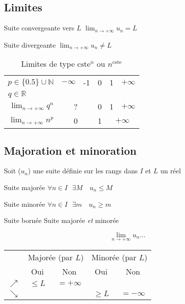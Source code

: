\documentclass{article}
\newcommand{\R}{\mathds{R}}
\newcommand{\N}{\mathds{N}}
\newcommand{\twoCols}[1]{\multicolumn{2}{c|}{#1}}
\newcommand{\twoColsNB}[1]{\multicolumn{2}{c}{#1}}
\newcommand{ \const}{\text{cste}}
\newenvironment{descriptiona}{\begin{description}[leftmargin=!,labelwidth=\widthof{\bfseries The longest label}]}{\end{description}}
\begin{document}
\subsection{Limites}
\begin{descriptiona}
\item[Suite convergeante vers $L$] $\displaystyle \lim_{n\to+\infty} u_n = L$
\item[Suite divergeante] $\displaystyle \lim_{n\to+\infty} u_n \not= L$
\end{descriptiona}

\begin{minipage}{\textwidth}

\begin{table}[H]
    \centering
    \begin{tabular}{r||l|c|c|c|l}
         $p \in \{0.5\}\cup\N$            & $-\infty$ & -1 & 0 & 1 & $+\infty$  \\
         $q \in \R\quad\quad\quad\;\:$ & & & & \\\hline\hline
        $\displaystyle\lim_{n\to+\infty} q^n$ & \twoCols{?} & 0 & 1 & $+\infty$ \\\hline
        $\displaystyle\lim_{n\to+\infty} n^p$ & \twoCols{0} & 1 & \twoColsNB{$+\infty$}
    \end{tabular}
    \caption*{Limites de type $\const^n$ ou $n^\const$}
    \label{tab:my_label}
\end{table}


\end{minipage}

\subsection{Majoration et minoration}

Soit ($u_n$) une suite définie sur les rangs dans $I$ et $L$ un réel
\begin{descriptiona}
\item[Suite majorée] $\forall n \in I \:\:\: \exists M \quad u_n \leq M$
\item[Suite minorée] $\forall n \in I \:\:\: \exists m \quad u_n \geq m$
\item[Suite bornée] Suite majorée \textit{et} minorée
\end{descriptiona}

\[\lim_{n\to+\infty} u_n \dots\]

\begin{table}[H]
    \centering
    \begin{tabular}{c|cccc}
                & \multicolumn{2}{c}{Majorée (par $L$)}   & \multicolumn{2}{c}{Minorée (par $L$)}    \\
                & Oui               & Non                 & Oui                 & Non                \\
                \hline
    $\nearrow$  & $\leq L$          & $= +\infty$            &                     &                    \\
    $\searrow$  &                   &                     & $\geq L$            & $=-\infty$
    \end{tabular}
\end{table}
\end{document}
